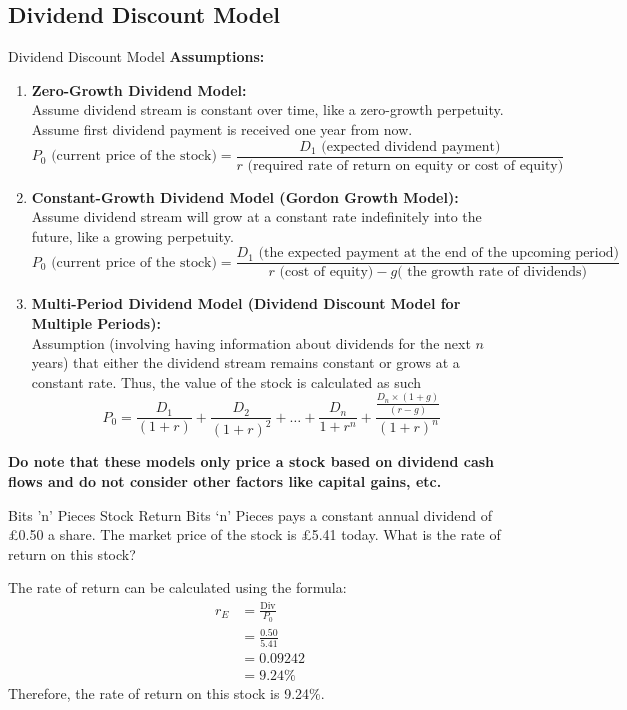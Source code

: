 \subsection*{Dividend Discount Model}
\begin{definitionbox}{Dividend Discount Model}
\textbf{Assumptions:}
\begin{enumerate}
    \item \textbf{Zero-Growth Dividend Model: }\\Assume dividend stream is constant over time, like a zero-growth perpetuity. Assume first dividend payment is received one year from now.
    \begin{equation}
        P_0 \text{ (current price of the stock)}= \frac{D_1 \text{ (expected dividend payment)}}{r \text{ (required rate of return on equity or cost of equity)}}
    \end{equation}
    \item \textbf{Constant-Growth Dividend Model (Gordon Growth Model): }\\Assume dividend stream will grow at a constant rate indefinitely into the future, like a growing perpetuity.
    \begin{equation}
        P_0 \text{ (current price of the stock)}= \frac{D_1 \text{ (the expected payment at the end of the upcoming period)}}{r \text{ (cost of equity)} - g \text{( the growth rate of dividends)}}
    \end{equation}
    \item \textbf{Multi-Period Dividend Model (Dividend Discount Model for Multiple Periods): }\\Assumption (involving having information about dividends for the next $n$ years) that either the dividend stream remains constant or grows at a constant rate. Thus, the value of the stock is calculated as such
    \begin{equation}
        P_0 = \frac{D_1}{(1+r)} + \frac{D_2}{(1+r)^2} + \ldots + \frac{D_n}{1+r^n} + \frac{\frac{D_n \times (1+g)}{(r-g)}}{(1+r)^n}
    \end{equation}
\end{enumerate}

\textbf{Do note that these models only price a stock based on dividend cash flows and do not consider other factors like capital gains, etc.}

\end{definitionbox}

\begin{examplebox}{Bits 'n' Pieces Stock Return}
    Bits ‘n’ Pieces pays a constant annual dividend of £0.50 a share. The market price of the stock is £5.41 today. What is the rate of return on this stock?
    
    The rate of return can be calculated using the formula:
    \begin{align*}
        r_E &= \frac{\text{Div}}{P_0} \\
        &= \frac{0.50}{5.41} \\
        &= 0.09242 \\
        &= 9.24\%
    \end{align*}
    Therefore, the rate of return on this stock is 9.24\%.
\end{examplebox}

